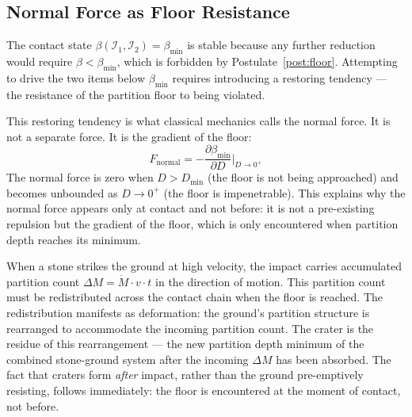 \subsection{Normal Force as Floor Resistance}
\label{subsec:normal}

The contact state $\beta(\mathcal{I}_1, \mathcal{I}_2) = \beta_{\min}$ is
stable because any further reduction would require $\beta < \beta_{\min}$, which
is forbidden by Postulate~\ref{post:floor}. Attempting to drive the two items
below $\beta_{\min}$ requires introducing a restoring tendency --- the resistance
of the partition floor to being violated.

This restoring tendency is what classical mechanics calls the normal force. It
is not a separate force. It is the gradient of the floor:
\begin{equation}
    F_{\mathrm{normal}} = -\frac{\partial \beta_{\min}}{\partial D}
    \bigg|_{D \to 0^+}
    \label{eq:normal}
\end{equation}
The normal force is zero when $D > D_{\min}$ (the floor is not being approached)
and becomes unbounded as $D \to 0^+$ (the floor is impenetrable). This explains
why the normal force appears only at contact and not before: it is not a
pre-existing repulsion but the gradient of the floor, which is only encountered
when partition depth reaches its minimum.

\begin{remark}
\label{rem:craters}
When a stone strikes the ground at high velocity, the impact carries accumulated
partition count $\Delta M = \dot{M} \cdot v \cdot t$ in the direction of motion.
This partition count must be redistributed across the contact chain when the
floor is reached. The redistribution manifests as deformation: the ground's
partition structure is rearranged to accommodate the incoming partition count.
The crater is the residue of this rearrangement --- the new partition depth
minimum of the combined stone-ground system after the incoming $\Delta M$ has
been absorbed. The fact that craters form \emph{after} impact, rather than the
ground pre-emptively resisting, follows immediately: the floor is encountered at
the moment of contact, not before.
\end{remark}
